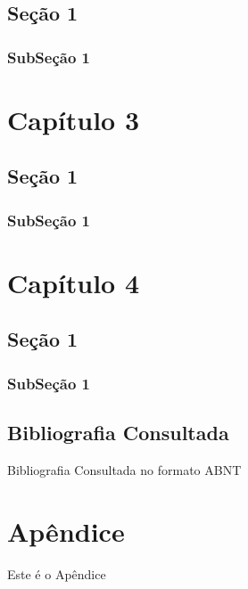 \documentclass[11pt]{article}
\begin{document}
\subsection{\textbf{Seção 1}}
\subsubsection{\textbf{SubSeção 1}}
\newpage


\section{\textbf{Capítulo 3}}
\subsection{\textbf{Seção 1}}
\subsubsection{\textbf{SubSeção 1}}
\newpage

\section{\textbf{Capítulo 4}}
\subsection{\textbf{Seção 1}}
\subsubsection{\textbf{SubSeção 1}}

\newpage
\begin{thebibliography}{9}
\section{\textbf{Bibliografia Consultada}}
Bibliografia Consultada no formato ABNT
\end{thebibliography}

\newpage
\appendix
\section{Apêndice}
Este é o Apêndice 
\end{document}
